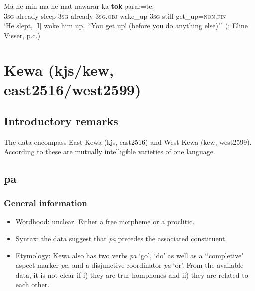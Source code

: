 \begin{exe}
	\ex\label{exAppendixKalamangFirstImperative}
	\gll Ma he min ma he mat nawarar ka \textbf{tok} parar=te.\\
	3\textsc{sg} already sleep 3\textsc{sg} already 3\textsc{sg}.\textsc{obj} wake\_up 3\textsc{sg} still get\_up=\textsc{non}.\textsc{fin}\\
	\glt \lq He slept, [I] woke him up, \lq\lq You get up! (before you do anything else)"' (\cite{Visser2021a}; Eline Visser, p.c.)
\end{exe}
 
\section{Kewa (kjs/kew, east2516/west2599)}
\label{appendixKewa}
\subsection{Introductory remarks}
The data encompass East Kewa (kjs, east2516) and West Kewa (kew, west2599). According to \textcite{Franklin1968} these are mutually intelligible varieties of one language.

\subsection{pa}
\subsubsection{General information}
\begin{itemize}
	\item Wordhood: unclear. Either a free morpheme or a proclitic.
	\item Syntax: the data suggest that \textit{pa} precedes the associated constituent.
	\item Etymology: Kewa also has two verbs \textit{pa} \lq go', \lq do' as well as a \lq\lq completive" aspect marker \textit{pa}, and a disjunctive coordinator \textit{pa} \lq or'. From the available data, it is not clear if i) they are true homphones and ii) they are related to each other.
\end{itemize}

